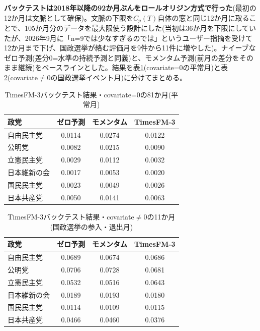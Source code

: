 \documentclass[a4paper,11pt]{ltjsarticle}
\begin{document}
\textbf{バックテストは2018年以降の92か月ぶんをロールオリジン方式で行った}(最初の12か月は文脈として確保)。文脈の下限を$C_p(T)$自体の窓と同じ12か月に取ることで、105か月分のデータを最大限使う設計にした(当初は36か月を下限にしていたが、2026年9月に「n=9では少なすぎるのでは」というユーザー指摘を受けて12か月まで下げ、国政選挙が絡む評価月を9件から11件に増やした)。ナイーブなゼロ予測(差分0=水準の持続予測と同義)と、モメンタム予測(前月の差分をそのまま継続)をベースラインとした。結果を表\ref{tab:timesfm-backtest-quiet}(covariate=0の平常月)と表\ref{tab:timesfm-backtest-event}(covariate$\neq$0の国政選挙イベント月)に分けてまとめる。

\begin{table}[h]
\centering
\small
\caption{TimesFM-3バックテスト結果・covariate=0の81か月(平常月)}
\label{tab:timesfm-backtest-quiet}
\begin{tabular}{lccc}
\toprule
政党 & ゼロ予測 & モメンタム & TimesFM-3 \\
\midrule
自由民主党 & 0.0114 & 0.0274 & 0.0122 \\
公明党 & 0.0082 & 0.0215 & 0.0090 \\
立憲民主党 & 0.0029 & 0.0112 & 0.0032 \\
日本維新の会 & 0.0017 & 0.0053 & 0.0020 \\
国民民主党 & 0.0023 & 0.0049 & 0.0026 \\
日本共産党 & 0.0050 & 0.0141 & 0.0063 \\
\bottomrule
\end{tabular}
\end{table}

\begin{table}[h]
\centering
\small
\caption{TimesFM-3バックテスト結果・covariate$\neq$0の11か月(国政選挙の参入・退出月)}
\label{tab:timesfm-backtest-event}
\begin{tabular}{lccc}
\toprule
政党 & ゼロ予測 & モメンタム & TimesFM-3 \\
\midrule
自由民主党 & 0.0689 & 0.0674 & 0.0686 \\
公明党 & 0.0706 & 0.0728 & 0.0681 \\
立憲民主党 & 0.0532 & 0.0516 & 0.0643 \\
日本維新の会 & 0.0189 & 0.0193 & 0.0180 \\
国民民主党 & 0.0114 & 0.0109 & 0.0115 \\
日本共産党 & 0.0466 & 0.0460 & 0.0376 \\
\bottomrule
\end{tabular}
\end{table}
\end{document}
